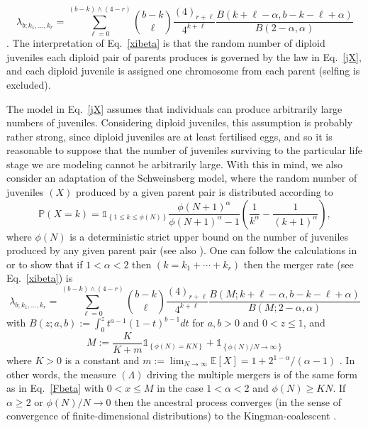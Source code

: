 \documentclass{article}
\newcommand{\be}{\begin{equation}}
\newcommand{\ee}{\end{equation}}
\newcommand{\EE}[1]{\ensuremath{\mathds{E}\left[ #1 \right]}}%
\newcommand{\one}[1]{\ensuremath{\mathds{1}_{\left\{ #1 \right\}}}}%
\newcommand{\prb}[1]{\ensuremath{\mathds{P}\left( #1 \right) } }%
\begin{document}
\be\label{xibeta}
   \lambda_{b;k_1, \ldots, k_r} = \sum_{\ell = 0}^{ (b - k)\wedge (4-r) } \binom{b-k}{\ell} \frac{ (4)_{r+\ell} }{4^{k+\ell}} \frac{B(k+\ell - \alpha, b-k-\ell + \alpha ) }{B(2-\alpha,\alpha)}
\ee
\citep{Blath2016,BLS15}. The interpretation of Eq.\ \eqref{xibeta} is  that the random   number of diploid  juveniles each  diploid pair of parents  produces  is  governed by  the law in Eq.\ \eqref{jX},   and   each diploid juvenile  is assigned  one chromosome  from each parent (selfing is excluded).



The model in Eq.\ \eqref{jX} assumes that individuals can produce
arbitrarily large numbers of juveniles. Considering diploid juveniles,
this assumption is probably rather strong, since diploid juveniles are
at least fertilised eggs, and so it is reasonable to suppose that the
number of juveniles surviving to the  particular life stage we are modeling  cannot be
arbitrarily large.  With this in mind, we also consider an adaptation
of the Schweinsberg model, where the random number of juveniles $(X)$
produced by a   given parent pair  is distributed according to
\be\label{jtr}
  \prb{X=k} =   \one{1 \le k \le \phi(N)} \frac{\phi(N+1)^\alpha }{ \phi(N+1)^\alpha - 1 }  \left( \frac{1}{k^\alpha} - \frac{1}{(k+1)^\alpha}  \right) ,
\ee
where $\phi(N)$ is a deterministic strict upper bound on the number of juveniles produced by  any given parent pair (see also \citep{Eldon2018}).   One can follow the calculations in  \citep{schweinsberg03} or \citep{BLS15}  to show  that  if $1 < \alpha < 2$   then  $(k = k_1 + \cdots + k_r)$ then the merger rate (see Eq.\ \eqref{xibeta}) is
\be
   \lambda_{b;k_1, \ldots, k_r} =  \sum_{\ell = 0}^{ (b - k)\wedge (4-r) } \binom{b-k}{\ell} \frac{ (4)_{r+\ell} }{4^{k+\ell}} \frac{B(M; k+\ell - \alpha, b-k-\ell + \alpha ) }{B(M;2-\alpha,\alpha)}
\ee
with $B(z;a,b) := \int_0^z t^{a-1}(1-t)^{b-1}dt$ for  $a,b>0$ and $0< z\le 1$, and
\be
M :=  \frac{K}{K+m} \one{\phi(N) = KN} + \one{\phi(N)/N \to \infty }
\ee
where $K > 0$ is a constant and  $m := \lim_{N\to \infty} \EE{X} = 1 + 2^{1-\alpha}/(\alpha - 1)$ \citep{CDEE2020,AEKKZ2020}.    In other words,  the measure $(\Lambda)$ driving the multiple mergers is of the same form as in Eq.\ \eqref{Fbeta}  with $0 < x \le M$ in the case $1 < \alpha < 2$ and $\phi(N) \ge KN$.   If $\alpha \ge 2$ or $\phi(N)/N \to 0$ then  the  ancestral process converges (in the sense of convergence of  finite-dimensional distributions) to  the Kingman-coalescent \citep{CDEE2020,AEKKZ2020}.
\end{document}
